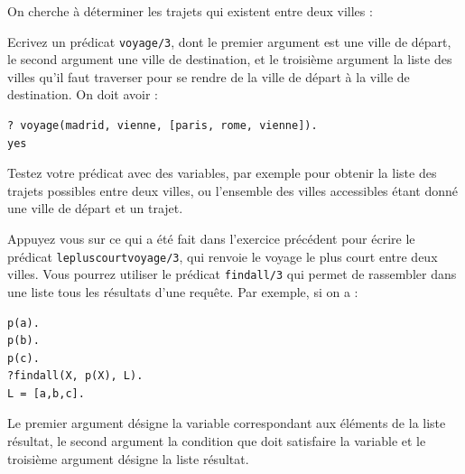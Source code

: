 \documentclass[a4paper]{article}
\newenvironment{CAnswer}{\color{red}\begin{Answer}}
                        {\end{Answer}}
\begin{document}
\begin{Exercise}[title={Voyage}]
On cherche à déterminer les trajets qui existent entre deux villes :
\begin{center}
\end{center}
\Question Ecrivez un prédicat \verb$voyage/3$, dont le premier argument est une
ville de départ, le second argument une ville de destination, et le troisième
argument la liste des villes qu'il faut traverser pour se rendre de la ville de
départ à la ville de destination. On doit avoir :
\begin{verbatim}
?­ voyage(madrid, vienne, [paris, rome, vienne]).
yes
\end{verbatim}
Testez votre prédicat avec des variables, par exemple pour obtenir la liste des
trajets possibles entre deux villes, ou l'ensemble des villes accessibles étant
donné une ville de départ et un trajet.

\Question Appuyez vous sur ce qui a été fait dans l'exercice précédent pour
écrire le prédicat \verb$lepluscourtvoyage/3$, qui renvoie le voyage le plus
court entre deux villes. Vous pourrez utiliser le prédicat \verb$findall/3$ qui
permet de rassembler dans une liste tous les résultats d'une requête. Par
exemple, si on a :
\begin{verbatim}
p(a).
p(b).
p(c).
?­findall(X, p(X), L).
L = [a,b,c].
\end{verbatim}
Le premier argument désigne la variable correspondant aux éléments de la liste
résultat, le second argument la condition que doit satisfaire la variable et le
troisième argument désigne la liste résultat.
\end{Exercise}
\begin{CAnswer}

\end{CAnswer}
\end{document}
